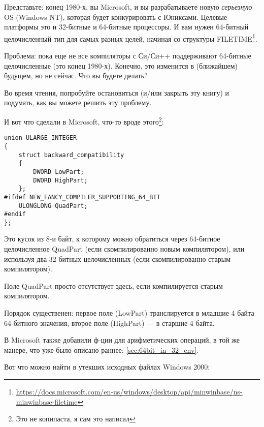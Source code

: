 \label{LargeInteger}

Представьте: конец 1980-х, вы Microsoft, и вы разрабатываете новую \emph{серьезную} \ac{OS} (Windows NT),
которая будет конкурировать с Юниксами.
Целевые платформы это и 32-битные и 64-битные процессоры.
И вам нужен 64-битный целочисленный тип для самых разных целей, начиная со структуры 
FILETIME\footnote{\url{https://docs.microsoft.com/en-us/windows/desktop/api/minwinbase/ns-minwinbase-filetime}}.

Проблема: пока еще не все компиляторы с Си/Си++ поддерживают 64-битные целочисленные (это конец 1980-х).
Конечно, это изменится в (ближайшем) будущем, но не сейчас.
Что вы будете делать?

Во время чтения, попробуйте остановиться (и/или закрыть эту книгу) и подумать, как вы можете решить эту проблему.

\clearpage

И вот что сделали в Microsoft, что-то вроде этого\footnote{Это не копипаста, я сам это написал}:

\begin{lstlisting}
union ULARGE_INTEGER
{
    struct backward_compatibility
    {
        DWORD LowPart;
        DWORD HighPart;
    };
#ifdef NEW_FANCY_COMPILER_SUPPORTING_64_BIT
    ULONGLONG QuadPart;
#endif
};
\end{lstlisting}

Это кусок из 8-и байт, к которому можно обратиться через 64-битное целочисленное QuadPart (если скомпилированно новым компилятором),
или используя два 32-битных целочисленных (если скомпилированно старым компилятором).

Поле QuadPart просто отсутствует здесь, если компилируется старым компилятором.

Порядок существенен: первое поле (LowPart) транслируется в младшие 4 байта 64-битного значения, второе поле (HighPart) ---
в старшие 4 байта.

В Microsoft также добавили ф-ции для арифметических операций, в той же манере, что уже было описано раннее:
\ref{sec:64bit_in_32_env}.

Вот что можно найти в утекших исходных файлах Windows 2000:

